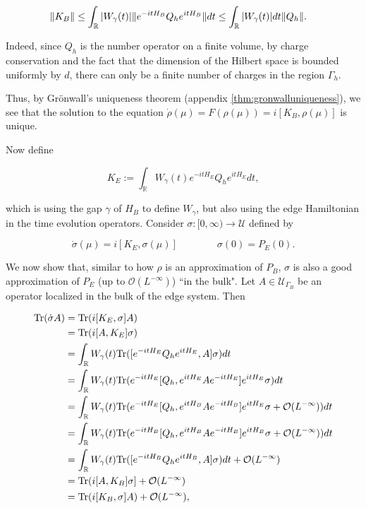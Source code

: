 \documentclass[12pt, letterpaper]{article}
\begin{document}
\[\begin{aligned}
\lVert K_B \rVert &\leq \int_\mathbb{R}|W_\gamma(t)| \lVert e^{-itH_B}Q_he^{itH_B} \rVert dt\leq \int_\mathbb{R}|W_\gamma(t)|dt\lVert Q_h \rVert.
\end{aligned}\]

Indeed, since $Q_h$ is the number operator on a finite volume, by charge conservation and the fact that the dimension of the Hilbert space is bounded uniformly by $d$, there can only be a finite number of charges in the region $\Gamma_h$.

Thus, by Gr\"{o}nwall's uniqueness theorem (appendix \ref{thm:gronwalluniqueness}), we see that the solution to the equation $\dot{\rho}(\mu) = F(\rho(\mu)) = i[K_B,\rho(\mu)]$ is unique. 

Now define 

\[K_E := \int_\mathbb{R} W_\gamma(t) e^{-itH_E}Q_he^{itH_E}dt,\]

which is using the gap $\gamma$ of $H_B$ to define $W_\gamma$, but also using the edge Hamiltonian in the time evolution operators. Consider $\sigma:[0,\infty)\to\mathcal{U}$ defined by

\[\dot{\sigma}(\mu) = i[K_E, \sigma(\mu)] \quad\quad\quad\quad \sigma(0) = P_E(0).\]

We now show that, similar to how $\rho$ is an approximation of $P_B$, $\sigma$ is also a good approximation of $P_E$ (up to $\mathcal{O}(L^{-\infty})$) ``in the bulk". Let $A\in \mathcal{U}_{\Gamma_B}$ be an operator localized in the bulk of the edge system. Then 

\[\begin{aligned}
\text{Tr}(\dot{\sigma} A) &= \text{Tr} (i[K_E, \sigma]A)\\
&= \text{Tr}(i[A,K_E]\sigma)\\
&= \int_\mathbb{R}W_\gamma(t) \text{Tr}([e^{-itH_E}Q_he^{itH_E}, A] \sigma)dt\\
&= \int_\mathbb{R}W_\gamma(t) \text{Tr}(e^{-itH_E}[Q_h, e^{itH_E}Ae^{-itH_E}]e^{itH_E} \sigma)dt\\
&= \int_\mathbb{R}W_\gamma(t) \text{Tr}(e^{-itH_E}[Q_h, e^{itH_B}Ae^{-itH_B}]e^{itH_E}\sigma + \mathcal{O}(L^{-\infty}))dt\\
&= \int_\mathbb{R}W_\gamma(t) \text{Tr}(e^{-itH_B}[Q_h, e^{itH_B}Ae^{-itH_B}]e^{itH_B}\sigma + \mathcal{O}(L^{-\infty}))dt\\
&= \int_\mathbb{R}W_\gamma(t) \text{Tr}([e^{-itH_B}Q_he^{itH_B}, A] \sigma)dt + \mathcal{O}(L^{-\infty})\\
&= \text{Tr}(i[A,K_B]\sigma] + \mathcal{O}(L^{-\infty})\\
&= \text{Tr}(i[K_B,\sigma]A) + \mathcal{O}(L^{-\infty}),
\end{aligned}\]
\end{document}
